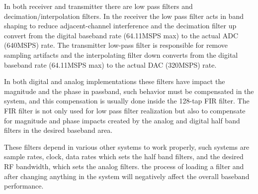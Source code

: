 
In both receiver and transmitter there are low pass filters and
decimation/interpolation filters. In the receiver the low pass filter acts in
band shaping to reduce adjacent-channel interference and the decimation filter
up convert from the digital baseband rate (64.11MSPS max) to the actual ADC
(640MSPS) rate. The transmitter low-pass filter is responsible for remove
sampling artifacts and the interpolating filter down converts from the digital
baseband rate (64.11MSPS max) to the actual DAC (320MSPS) rate.

In both digital and analog implementations these filters have impact the
magnitude and the phase in passband, such behavior must be compensated in the
system, and this compensation is usually done inside the 128-tap FIR filter. The
FIR filter is not only used for low pass filter realization but also to
compensate for magnitude and phase impacts created by the analog and digital
half band filters in the desired baseband area.

These filters depend in various other systems to work properly, such systems are
sample rates, clock, data rates which sets the half band filters, and the
desired RF bandwidth, which sets the analog filters. the process of loading a
filter and after changing anything in the system will negatively affect the
overall baseband performance.


